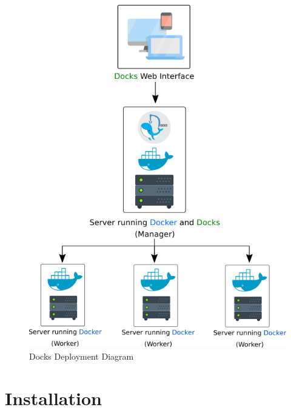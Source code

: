 \documentclass[]{article}
\begin{document}
\begin{figure}[h!]
	\centering
	\includegraphics[scale=0.6]{deployment_diagram.png}
	\caption{Docks Deployment Diagram}
\end{figure}

\pagebreak

\section{Installation}
\end{document}
